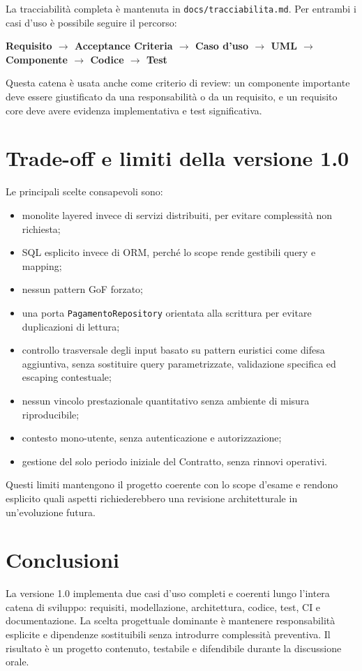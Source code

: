 \documentclass[11pt,a4paper]{article}
\begin{document}
La tracciabilità completa è mantenuta in \texttt{docs/tracciabilita.md}. Per entrambi i casi d'uso è possibile seguire il percorso:

\begin{center}
\textbf{Requisito $\rightarrow$ Acceptance Criteria $\rightarrow$ Caso d'uso $\rightarrow$ UML $\rightarrow$ Componente $\rightarrow$ Codice $\rightarrow$ Test}
\end{center}

Questa catena è usata anche come criterio di review: un componente importante deve essere giustificato da una responsabilità o da un requisito, e un requisito core deve avere evidenza implementativa e test significativa.

\section{Trade-off e limiti della versione 1.0}

Le principali scelte consapevoli sono:

\begin{itemize}
  \item monolite layered invece di servizi distribuiti, per evitare complessità non richiesta;
  \item SQL esplicito invece di ORM, perché lo scope rende gestibili query e mapping;
  \item nessun pattern GoF forzato;
  \item una porta \texttt{PagamentoRepository} orientata alla scrittura per evitare duplicazioni di lettura;
  \item controllo trasversale degli input basato su pattern euristici come difesa aggiuntiva, senza sostituire query parametrizzate, validazione specifica ed escaping contestuale;
  \item nessun vincolo prestazionale quantitativo senza ambiente di misura riproducibile;
  \item contesto mono-utente, senza autenticazione e autorizzazione;
  \item gestione del solo periodo iniziale del Contratto, senza rinnovi operativi.
\end{itemize}

Questi limiti mantengono il progetto coerente con lo scope d'esame e rendono esplicito quali aspetti richiederebbero una revisione architetturale in un'evoluzione futura.

\section{Conclusioni}

La versione 1.0 implementa due casi d'uso completi e coerenti lungo l'intera catena di sviluppo: requisiti, modellazione, architettura, codice, test, CI e documentazione. La scelta progettuale dominante è mantenere responsabilità esplicite e dipendenze sostituibili senza introdurre complessità preventiva. Il risultato è un progetto contenuto, testabile e difendibile durante la discussione orale.
\end{document}
